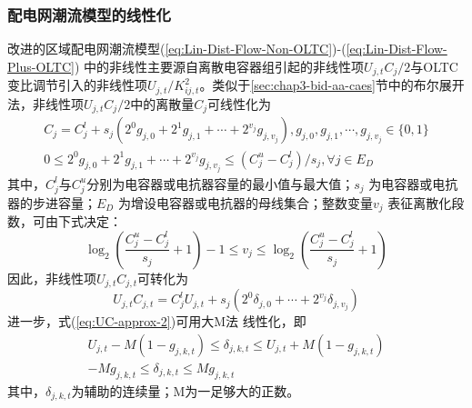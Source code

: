 \subsubsection{配电网潮流模型的线性化}
改进的区域配电网潮流模型(\ref{eq:Lin-Dist-Flow-Non-OLTC})-(\ref{eq:Lin-Dist-Flow-Plus-OLTC}) 中的非线性主要源自离散电容器组引起的非线性项${U_{j,t}}{C_j}/2$与OLTC变比调节引入的非线性项${{{U_{j,t}}}}/{{K_{ij,t}^2}}$。类似于\ref{sec:chap3-bid-aa-caes}节中的布尔展开法，非线性项${U_{j,t}}{C_j}/2$中的离散量$C_j$可线性化为\cite{PDN-Model-Reactive-Power-DT-16, CAES-IES-16-Rui}
\begin{subequations}
\begin{gather}
\label{eq:UC-approx}
{{C_j} = C_j^l + {s_j}({{2^0}{g_{j,0}} + {2^1}{g_{j,1}} + \cdots + {2^{{v_j}}}{g_{j,{v_j}}}})}, {{g_{j,0}},{g_{j,1}}, \cdots ,{g_{j,{v_j}}} \in \{ 0,1\} }\\
{0 \le {2^0}{g_{j,0}} + {2^1}{g_{j,1}} +  \cdots  + {2^{{v_j}}}{g_{j,{v_j}}} \le ({C_j^u - C_j^l})/{s_j},}{\forall j \in {E_D}}
\end{gather}
\end{subequations}
其中，$C_j^l$与$C_j^u$分别为电容器或电抗器容量的最小值与最大值；${s_j}$ 为电容器或电抗器的步进容量；${E_D}$ 为增设电容器或电抗器的母线集合；整数变量$v_j$ 表征离散化段数，可由下式决定：
\begin{equation}
{\log _2}({\frac{{C_j^u - C_j^l}}{{{s_j}}} + 1})-1 \le {v_j} \le {\log _2}({\frac{{C_j^u - C_j^l}}{{{s_j}}} + 1})
\end{equation}
因此，非线性项${U_{j,t}}{C_{j,t}}$可转化为
\begin{equation}
\label{eq:UC-approx-2}
{U_{j,t}}{C_{j,t}} = C_j^l{U_{j,t}} + {s_j}({{2^0}{\delta _{j,0}} +  \cdots  + {2^{{v_j}}}{\delta _{j,{v_j}}}})
\end{equation}
进一步，式(\ref{eq:UC-approx-2})可用大M法\cite{Big-M-1981} 线性化，即
\begin{subequations}
\label{eq:UC-approx-final}
\begin{gather}
{{U_{j,t}} - M({1 - {g_{j,k,t}}}) \le {\delta _{j,k,t}} \le {U_{j,t}} + M({1 - {g_{j,k,t}}})}\\
{ - M{g_{j,k,t}} \le {\delta _{j,k,t}} \le M{g_{j,k,t}}}
\end{gather}
\end{subequations}
其中，${\delta _{j,k,t}}$为辅助的连续量；M为一足够大的正数。

